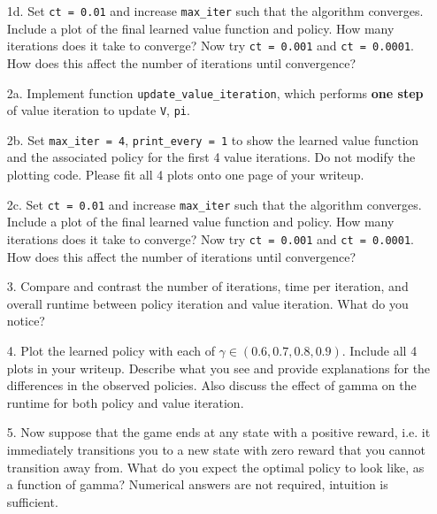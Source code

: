 \documentclass[submit]{harvardml}
\begin{document}
\begin{framed}
\begin{itemize}
    \item [1d.] Set \texttt{ct = 0.01} and increase \texttt{max\_iter} such that the algorithm converges. Include a plot of the final learned value function and policy. How many iterations does it take to converge? Now try \texttt{ct = 0.001} and \texttt{ct = 0.0001}. How does this affect the number of iterations until convergence?
      
    \item [2a.] Implement function
      \texttt{update\_value\_iteration}, which performs \textbf{one step} of value iteration to update \texttt{V}, \texttt{pi}.
      
    \item [2b.] Set \texttt{max\_iter = 4}, \texttt{print\_every = 1} to show the learned value function and the associated policy for the first 4 value iterations. Do not modify the plotting code. Please fit all 4 plots onto one page of your writeup.
    
    \item [2c.] Set \texttt{ct = 0.01} and increase \texttt{max\_iter} such that the algorithm converges. Include a plot of the final learned value function and policy. How many iterations does it take to converge? Now try \texttt{ct = 0.001} and \texttt{ct = 0.0001}. How does this affect the number of iterations until convergence?
    
    \item[3.] Compare and contrast the number of iterations, time per iteration, and overall runtime between policy iteration and value iteration. What do you notice?
    
    \item[4.] Plot the learned policy with each of $\gamma \in (0.6,0.7,0.8,0.9)$. Include all 4 plots in your writeup. Describe what you see and provide explanations for the differences in the observed policies. Also discuss the effect of gamma on the runtime for both policy and value iteration.
    
    \item[5.] Now suppose that the game ends at any state with a positive reward, i.e. it immediately transitions you to a new state with zero reward that you cannot transition away from. What do you expect the optimal policy to look like, as a function of gamma? Numerical answers are not required, intuition is sufficient.
 
\end{itemize}
\end{framed}
\end{document}
